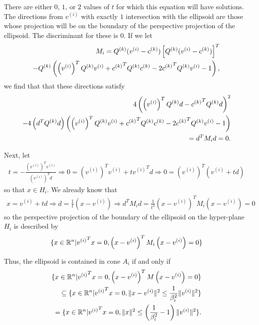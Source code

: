 There are either $0$, $1$, or $2$ values of $t$ for which this equation will have solutions.
The directions from $v^{(i)}$ with exactly $1$ intersection with the ellipsoid are those whose projection will be on the boundary of the perspective projection of the ellipsoid.
The discriminant for these is $0$.
If we let
\begin{align*}
M_i = 
{Q^{(k)}} (v^{(i)} - {c^{(k)}} )\left[{Q^{(k)}} (v^{(i)} - {c^{(k)}} )\right]^T \\
- {Q^{(k)}}  \left(\left(v^{(i)}\right)^T {Q^{(k)}}  v^{(i)} + {c^{(k)}} ^T {Q^{(k)}}  {c^{(k)}}  - 2 {c^{(k)}} ^T {Q^{(k)}}  v^{(i)} - 1\right),
\end{align*}
we find that that these directions satisfy
\begin{align*}
4\left(\left(v^{(i)}\right)^T {Q^{(k)}}  d - {c^{(k)}} ^T{Q^{(k)}} d\right)^2 \\
- 4 \left(d^T{Q^{(k)}} d\right) \left(\left(v^{(i)}\right)^T {Q^{(k)}}  v^{(i)} + {c^{(k)}} ^T {Q^{(k)}}  {c^{(k)}}  - 2 {c^{(k)}} ^T {Q^{(k)}}  v^{(i)} - 1\right) \\
= d^TM_id = 0.
\end{align*}


Next, let
\begin{align*}
t = -\frac {\left(v^{(i)}\right)^T v^{(i)}}{\left(v^{(i)}\right)^T d } \Longrightarrow
0 = \left(v^{(i)}\right)^T v^{(i)} + t {v^{(i)}}^T d \Longrightarrow
0 = \left(v^{(i)}\right)^T \left(v^{(i)} + t d\right)
\end{align*}
so that $x \in H_i$.
We already know that
\begin{align*}
x = v^{(i)} + t d \Longrightarrow
d = \frac 1 t \left(x - v^{(i)}\right)
\Longrightarrow d^TM_id = \frac 1 {t^2} \left(x - v^{(i)}\right)^TM_i\left(x - v^{(i)}\right) = 0
\end{align*}
so the perspective projection of the boundary of the ellipsoid on the hyper-plane $H_i$ is described by
\begin{align*}
\{x \in \mathbb R^n | {v^{(i)}}^Tx = 0, \left(x - v^{(i)}\right)^TM_i\left(x - v^{(i)}\right) = 0\}
\end{align*}

Thus, the ellipsoid is contained in cone $A_i$ if and only if
\begin{align*}
\{x \in \mathbb R^n | {v^{(i)}}^Tx = 0, \left(x - v^{(i)}\right)^TM\left(x - v^{(i)}\right) = 0\} \\
\subseteq \{x \in \mathbb R^n | {v^{(i)}}^Tx = 0, \|x - v^{(i)}\|^2 \le \frac 1 {\beta_i^2}\|v^{(i)}\|^2 \} \\
= \{x \in \mathbb R^n | {v^{(i)}}^Tx = 0, \|x\|^2 \le \left(\frac 1 {\beta_i^2} - 1\right)\|v^{(i)}\|^2 \}.
\end{align*}

